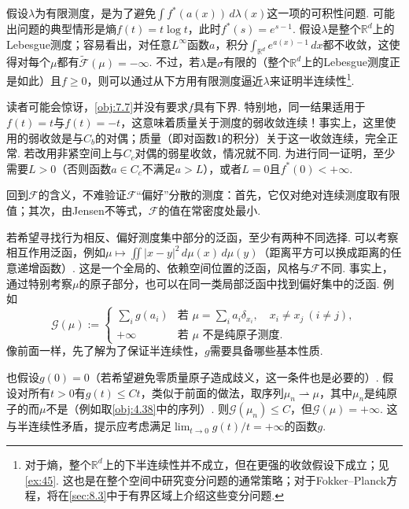 \begin{remark}\label{obj:7.8}
假设$\lambda$为有限测度，是为了避免$\int f^*(a(x))\,d\lambda(x)$这一项的可积性问题. 可能出问题的典型情形是熵$f(t)=t\log t$，此时$f^*(s)=e^{s-1}$. 假设$\lambda$是整个$\mathbb R^d$上的Lebesgue测度；容易看出，对任意$L^\infty$函数$a$，积分$\int_{\mathbb R^d}e^{a(x)-1}\,dx$都不收敛，这使得对每个$\mu$都有$\widetilde{\mathscr F}(\mu)=-\infty$. 不过，若$\lambda$是$\sigma$有限的（整个$\mathbb R^d$上的Lebesgue测度正是如此）且$f\geq0$，则可以通过从下方用有限测度逼近$\lambda$来证明半连续性\footnote{对于熵，整个$\mathbb R^d$上的下半连续性并不成立，但在更强的收敛假设下成立；见\autoref{ex:45}. 这也是在整个空间中研究变分问题的通常策略；对于Fokker--Planck方程，将在\autoref{sec:8.3}中于有界区域上介绍这些变分问题.}.
\end{remark}
\begin{remark}\label{obj:7.9}
读者可能会惊讶，\autoref{obj:7.7}并没有要求$f$具有下界. 特别地，同一结果适用于$f(t)=t$与$f(t)=-t$，这意味着质量关于测度的弱收敛连续！事实上，这里使用的弱收敛是与$C_b$的对偶；质量（即对函数$1$的积分）关于这一收敛连续，完全正常. 若改用非紧空间上与$C_c$对偶的弱星收敛，情况就不同. 为进行同一证明，至少需要$L>0$（否则函数$a\in C_c$不满足$a>L$），或者$L=0$且$f^*(0)<+\infty$.
\end{remark}
回到$\mathscr F$的含义，不难验证$\mathscr F$“偏好”分散的测度：首先，它仅对绝对连续测度取有限值；其次，由Jensen不等式，$\mathscr F$的值在常密度处最小.

若希望寻找行为相反、偏好测度集中部分的泛函，至少有两种不同选择. 可以考察相互作用泛函，例如$\mu\mapsto\iint|x-y|^2\,d\mu(x)\,d\mu(y)$（距离平方可以换成距离的任意递增函数）. 这是一个全局的、依赖空间位置的泛函，风格与$\mathscr F$不同. 事实上，通过特别考察$\mu$的原子部分，也可以在同一类局部泛函中找到偏好集中的泛函. 例如
\[
 \mathscr G(\mu):=\begin{cases}
 \displaystyle\sum_i g(a_i)&\text{若 }\mu=\sum_i a_i\delta_{x_i},\quad x_i\ne x_j\ (i\ne j),\\
 +\infty&\text{若 }\mu\text{ 不是纯原子测度}.
 \end{cases}
\]
像前面一样，先了解为了保证半连续性，$g$需要具备哪些基本性质.

也假设$g(0)=0$（若希望避免零质量原子造成歧义，这一条件也是必要的）. 假设对所有$t>0$有$g(t)\leq Ct$，类似于前面的做法，取序列$\mu_n\rightharpoonup\mu$，其中$\mu_n$是纯原子的而$\mu$不是（例如取\autoref{obj:4.38}中的序列）. 则$\mathscr G(\mu_n)\leq C$，但$\mathscr G(\mu)=+\infty$. 这与半连续性矛盾，提示应考虑满足$\lim_{t\to0}g(t)/t=+\infty$的函数$g$.


